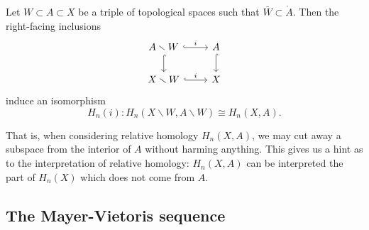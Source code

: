 \documentclass[main.tex]{subfiles}
\begin{document}
\begin{theorem}[excision]
  Let $W \subset A \subset X$ be a triple of topological spaces such that $\bar{W} \subset \mathring{A}$. Then the right-facing inclusions
  \begin{equation*}
    \begin{tikzcd}
      A \smallsetminus W
      \arrow[r, hook, "i"]
      \arrow[d, hook]
      & A
      \arrow[d, hook]
      \\
      X \smallsetminus W
      \arrow[r, hook, "i"]
      & X
    \end{tikzcd}
  \end{equation*}
  induce an isomorphism
  \begin{equation*}
    H_{n}(i)\colon H_{n}(X \smallsetminus W, A \smallsetminus W) \cong H_{n}(X, A).
  \end{equation*}
\end{theorem}

That is, when considering relative homology $H_{n}(X, A)$, we may cut away a subspace from the interior of $A$ without harming anything. This gives us a hint as to the interpretation of relative homology: $H_{n}(X, A)$ can be interpreted the part of $H_{n}(X)$ which does not come from $A$.

\subsection{The Mayer-Vietoris sequence}
\label{ssc:the_mayer_vietoris_sequence}
\end{document}
